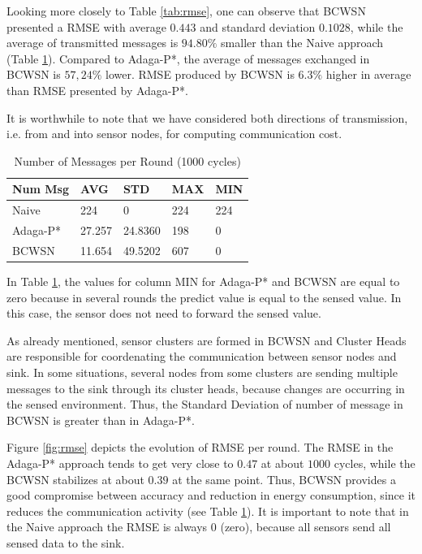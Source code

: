 \documentclass{acm_proc_article-sp}
\begin{document}
Looking more closely to Table \ref{tab:rmse}, one can observe that BCWSN
presented a RMSE with average $0.443$ and standard deviation $0.1028$,
while the average of transmitted messages is $94.80\%$ smaller than the Naive
approach (Table \ref{tab:num-msg}). Compared to Adaga-P*, the average of
messages exchanged in BCWSN is $57,24\%$ lower. RMSE produced by BCWSN is
$6.3\%$ higher in average than RMSE presented by Adaga-P*.
\vspace*{-.3cm}

It is worthwhile to note that we have considered both directions of
transmission, i.e. from and into sensor nodes, for computing communication cost.
\vspace*{-.3cm}


\begin{table}[h!]
\caption{Number of Messages per Round (1000 cycles)}
\label{tab:num-msg}
\begin{center}
\begin{tabular}{|l||l|l|l|l|}
\hline
Num Msg &AVG &STD &MAX &MIN \\
\hline\hline
Naive &224 &0 &224 &224 \\
\hline
Adaga-P* &27.257 &24.8360 &198 &0 \\
\hline
BCWSN &11.654 &49.5202 &607 &0 \\
\hline
\end{tabular}
\end{center}
\end{table}
\vspace*{-.3cm}

In Table \ref{tab:num-msg}, the values for column MIN for Adaga-P* and BCWSN are
equal to zero because in several rounds the predict value is equal to the sensed
value. In this case, the sensor does not need to forward the sensed value. 
\vspace*{-.3cm}

As already mentioned, sensor clusters are formed in BCWSN and Cluster Heads are
responsible for coordenating the communication between sensor nodes and sink.
In some situations, several nodes from some clusters are sending multiple 
messages to the sink through its cluster heads, because changes are occurring 
in the sensed environment. Thus, the Standard Deviation of number of message 
in BCWSN is greater than in Adaga-P*.
\vspace*{-.3cm}

Figure \ref{fig:rmse} depicts the evolution of RMSE per round. The RMSE in the
Adaga-P* approach tends to get very close to $0.47$ at about $1000$ cycles,
while the BCWSN stabilizes at about $0.39$ at the same point. Thus, BCWSN
provides a good compromise between accuracy and reduction in energy consumption,
since it reduces the communication activity (see Table \ref{tab:num-msg}). It is
important to note that in the Naive approach the RMSE is always 0 (zero),
because all sensors send all sensed data to the sink.
\vspace*{-.3cm}
\end{document}
